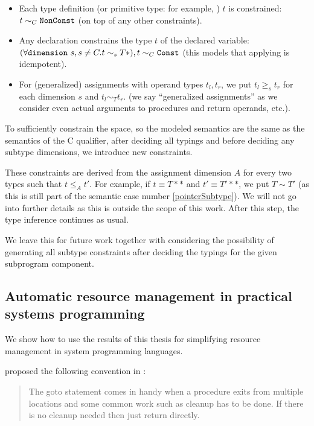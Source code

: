 \begin{itemize}
    \item Each type definition (or primitive type: for example, ) $t$ is constrained: $t \sim_C \mathtt{NonConst}$ (on top of any other constraints).

    \item Any declaration  constrains the type $t$ of the declared variable: $(\forall \mathtt{dimension}\ s, s \neq C. t \sim_s T\ast), t \sim_C \mathtt{Const}$ (this models that applying  is idempotent).

    \item For (generalized) assignments with operand types $t_l, t_r$, we put $t_l \geq_s t_r$ for each dimension $s$ and $t_l \sim_T t_r$. (we say ``generalized assignments'' as we consider even actual arguments to procedures and return operands, etc.).
\end{itemize}

To sufficiently constrain the space, so the modeled semantics are the same as the semantics of the C  qualifier, after deciding all typings and before deciding any subtype dimensions, we introduce new constraints.

These constraints are derived from the assignment dimension $A$ for every two types such that $t \leq_A t'$. For example, if $t \equiv T\ast\ast$ and $t' \equiv T'\ast\ast$, we put $T \sim T'$ (as this is still part of the semantic case number \ref{pointerSubtype}). We will not go into further details as this is outside the scope of this work. After this step, the type inference continues as usual.

We leave this for future work together with considering the possibility of generating all subtype constraints after deciding the typings for the given subprogram component.

\subsection{Automatic resource management in practical systems programming}
\label{sec:autoC}

We show how to use the results of this thesis for simplifying resource management in system programming languages.

\citet{kernelStyle} proposed the following convention in :

\begin{quote}
  The goto statement comes in handy when a procedure exits from multiple locations and some common work such as cleanup has to be done. If there is no cleanup needed then just return directly.
\end{quote}

